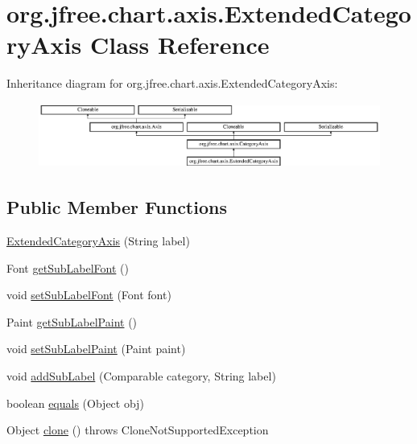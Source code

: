 \hypertarget{classorg_1_1jfree_1_1chart_1_1axis_1_1_extended_category_axis}{}\section{org.\+jfree.\+chart.\+axis.\+Extended\+Category\+Axis Class Reference}
\label{classorg_1_1jfree_1_1chart_1_1axis_1_1_extended_category_axis}
Inheritance diagram for org.\+jfree.\+chart.\+axis.\+Extended\+Category\+Axis\+:\begin{figure}[H]
\begin{center}
\leavevmode
\includegraphics[height=2.153846cm]{classorg_1_1jfree_1_1chart_1_1axis_1_1_extended_category_axis}
\end{center}
\end{figure}
\subsection*{Public Member Functions}
\begin{DoxyCompactItemize}
\item 
\mbox{\hyperlink{classorg_1_1jfree_1_1chart_1_1axis_1_1_extended_category_axis_af014a2dfcf9d4c529d7bd6e07b0bfdd0}{Extended\+Category\+Axis}} (String label)
\item 
Font \mbox{\hyperlink{classorg_1_1jfree_1_1chart_1_1axis_1_1_extended_category_axis_a0b167c7b8149bdaa6f608d0bd2fea7b9}{get\+Sub\+Label\+Font}} ()
\item 
void \mbox{\hyperlink{classorg_1_1jfree_1_1chart_1_1axis_1_1_extended_category_axis_aaaa091e9b6e36820bbae9783a54746f5}{set\+Sub\+Label\+Font}} (Font font)
\item 
Paint \mbox{\hyperlink{classorg_1_1jfree_1_1chart_1_1axis_1_1_extended_category_axis_a1aece6e248db92354b6a61e3af1c1e57}{get\+Sub\+Label\+Paint}} ()
\item 
void \mbox{\hyperlink{classorg_1_1jfree_1_1chart_1_1axis_1_1_extended_category_axis_a25d5fdb730377e92220fbd36cc4f274d}{set\+Sub\+Label\+Paint}} (Paint paint)
\item 
void \mbox{\hyperlink{classorg_1_1jfree_1_1chart_1_1axis_1_1_extended_category_axis_a62e86975b4e6d5d64d75eaec7549f305}{add\+Sub\+Label}} (Comparable category, String label)
\item 
boolean \mbox{\hyperlink{classorg_1_1jfree_1_1chart_1_1axis_1_1_extended_category_axis_a65476239b987b478b4e9f448ec4b94bf}{equals}} (Object obj)
\item 
Object \mbox{\hyperlink{classorg_1_1jfree_1_1chart_1_1axis_1_1_extended_category_axis_a722070d8eaba3d5f5a51871348b88ca8}{clone}} ()  throws Clone\+Not\+Supported\+Exception 
\end{DoxyCompactItemize}
